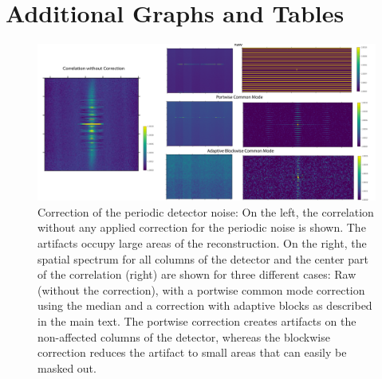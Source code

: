 \chapter{Additional Graphs and Tables}


\begin{figure}[h!]
	\centering
	\includegraphics[width=\linewidth]{images/correction.pdf}
	\caption[Correction of Periodic Detector Noise]{Correction of the periodic detector noise: On the left, the correlation without any applied correction for the periodic noise is shown. The artifacts occupy large areas of the reconstruction. On the right, the spatial spectrum for all columns of the detector and the center part of the correlation (right) are shown for three different cases: Raw (without the correction), with a portwise common mode correction using the median and a correction with adaptive blocks as described in the main text. The portwise correction creates artifacts on the non-affected columns of the detector, whereas the blockwise correction reduces the artifact to small areas that can easily be masked out.}
	\label{fig:app_correction}
\end{figure}

